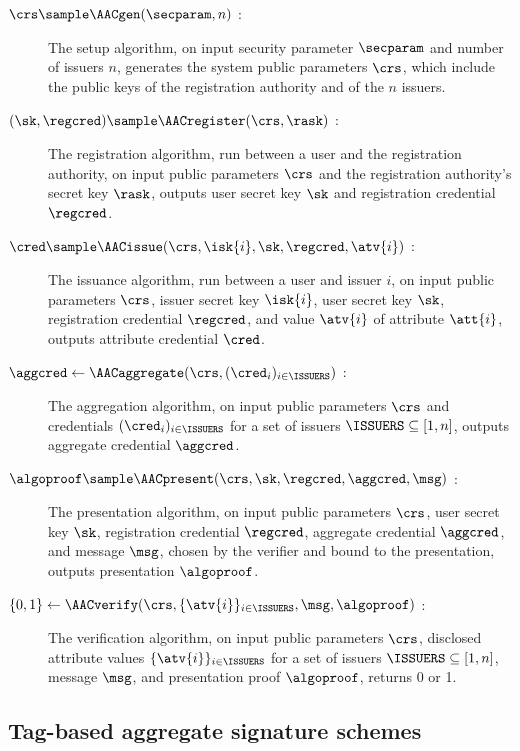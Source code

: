 \begin{description}

  \item[$\crs \sample \AACgen(\secparam, n)$ :] The setup algorithm, on input
security parameter $\secparam$ and number of issuers $n$, generates the system
public parameters $\crs$, which include the public keys of the registration
authority and of the $n$ issuers.

  \item[$(\sk,\regcred) \sample \AACregister(\crs,\rask)$ :] The registration
algorithm, run between a user and the registration authority, on input public
parameters $\crs$ and the registration authority's secret key $\rask$, outputs
user secret key $\sk$ and registration credential $\regcred$.

  \item[$\cred \sample \AACissue(\crs,\isk{i},\sk,\regcred,\atv{i})$ :] The
issuance algorithm, run between a user and issuer $i$, on input public
parameters $\crs$, issuer secret key $\isk{i}$, user secret key $\sk$,
registration credential $\regcred$, and value $\atv{i}$ of attribute
$\att{i}$, outputs attribute credential $\cred$.

  \item[$\aggcred \leftarrow \AACaggregate(\crs,(\cred_i)_{i \in \ISSUERS})$ :]
The aggregation algorithm, on input public parameters $\crs$ and credentials
$(\cred_i)_{i \in \ISSUERS}$ for a set of issuers $\ISSUERS \subseteq [1,n]$,
outputs aggregate credential $\aggcred$.

  \item[$\algoproof \sample \AACpresent(\crs,\sk,\regcred,\aggcred,\msg)$ :]
The presentation algorithm, on input public parameters $\crs$, user secret key
$\sk$, registration credential $\regcred$, aggregate credential $\aggcred$, and
message $\msg$, chosen by the verifier and bound to the presentation, outputs
presentation $\algoproof$.

  \item[$\{0,1\} \leftarrow \AACverify(\crs,\{\atv{i}\}_{i \in
\ISSUERS},\msg,\algoproof)$ :] The verification algorithm, on input public
parameters $\crs$, disclosed attribute values $\{\atv{i}\}_{i \in \ISSUERS}$
for a set of issuers $\ISSUERS \subseteq [1,n]$, message $\msg$, and
presentation proof $\algoproof$, returns 0 or 1.

\end{description}

\subsection{Tag-based aggregate signature schemes}

